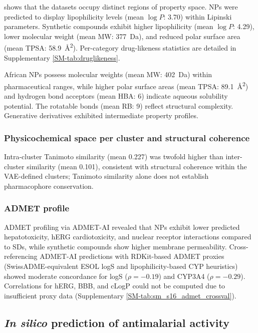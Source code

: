 \documentclass[journal=jcisd8,manuscript=article]{achemso}
\begin{document}
 shows that the datasets occupy distinct regions of property space. NPs were predicted to display lipophilicity levels (mean $\log P$:
\num{3.70}) within Lipinski parameters. Synthetic compounds exhibit higher lipophilicity (mean $\log P$: \num{4.29}), lower molecular weight (mean MW:
\qty{377}{\dalton}), and reduced polar surface area (mean TPSA: \qty{58.9}{\angstrom\squared}). Per-category drug-likeness statistics are detailed in
Supplementary \cref{SM-tab:druglikeness}.

African NPs possess molecular weights (mean MW: \qty{402}{\dalton}) within pharmaceutical ranges, while higher polar surface areas (mean TPSA:
\qty{89.1}{\angstrom\squared}) and hydrogen bond acceptors (mean HBA: \num{6}) indicate aqueous solubility potential. The rotatable bonds (mean RB: \num{9})
reflect structural complexity. Generative derivatives exhibited intermediate property profiles.

\subsubsection{Physicochemical space per cluster and structural coherence}
Intra-cluster Tanimoto similarity (mean \num{0.227}) was twofold higher than inter-cluster similarity (mean \num{0.101}), consistent with
structural coherence within the VAE-defined clusters; Tanimoto similarity alone does not establish pharmacophore conservation.
\subsubsection{ADMET profile}

ADMET profiling via ADMET-AI \cite{Swanson2024} revealed that NPs exhibit lower predicted hepatotoxicity, hERG cardiotoxicity, and nuclear receptor
interactions compared to SDs, while synthetic compounds show higher membrane permeability. Cross-referencing ADMET-AI predictions with RDKit-based ADMET
proxies (SwissADME-equivalent ESOL logS and lipophilicity-based CYP heuristics) showed moderate concordance for logS ($\rho = -0.19$) and CYP3A4 ($\rho =
-0.29$). Correlations for hERG, BBB, and cLogP could not be computed due to insufficient proxy data (Supplementary \cref{SM-tab:sm_s16_admet_crossval}).

\subsection{\textit{In silico} prediction of antimalarial activity}
\end{document}
